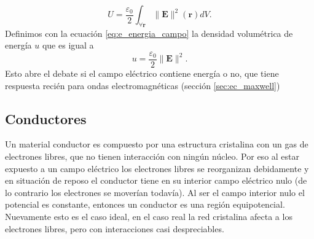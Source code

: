 \documentclass[11pt,a4paper]{article}
\numberwithin{equation}{section}
\begin{document}
\begin{equation}
    U = \frac{\varepsilon_0}{2}\int_{\forall \textbf{r}} \|\textbf{E}\|^2(\textbf{r}) dV.
    \label{eq:e_energia_campo}
\end{equation}
Definimos con la ecuación \ref{eq:e_energia_campo} la densidad volumétrica de energía $u$ que es igual a
\begin{equation}
    u = \frac{\varepsilon_0}{2} \|\textbf{E}\|^2.
    \label{eq:e_energia_densidad}
\end{equation}
Esto abre el debate si el campo eléctrico contiene energía o no, que tiene respuesta recién para ondas electromagnéticas (sección \ref{sec:ec_maxwell})
\subsection{Conductores}
Un material conductor es compuesto por una estructura cristalina con un gas de electrones libres, que no tienen interacción con ningún núcleo. Por eso al estar expuesto a un campo eléctrico los electrones libres se reorganizan debidamente y en situación de reposo el conductor tiene en su interior campo eléctrico nulo (de lo contrario los electrones se moverían todavía). Al ser el campo interior nulo el potencial es constante, entonces un conductor es una región equipotencial. Nuevamente esto es el caso ideal, en el caso real la red cristalina afecta a los electrones libres, pero con interacciones casi despreciables. 
\end{document}
